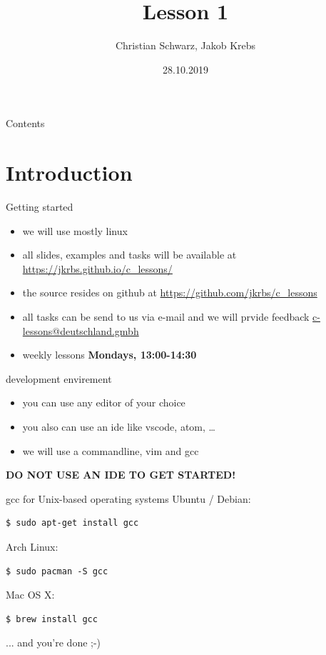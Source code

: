 \documentclass[10pt,graphics,aspectratio=169,table]{beamer}
\title{Lesson 1}
\author{Christian Schwarz, Jakob Krebs}
\date{28.10.2019}
\begin{document}
\maketitle

\begin{frame}{Contents}
	\tableofcontents
\end{frame}

\section{Introduction}
\begin{frame}{Getting started}
  \begin{itemize}
  \item we will use mostly linux
  \item all slides, examples and tasks will be available at
    \url{https://jkrbs.github.io/c_lessons/}
  \item the source resides on github at
    \url{https://github.com/jkrbs/c_lessons}
  \item all tasks can be send to us via e-mail and we will prvide feedback
    \url{c-lessons@deutschland.gmbh}
  \item weekly lessons \textbf{Mondays, 13:00-14:30}
  \end{itemize}
\end{frame}

\begin{frame}{development envirement}
  \begin{itemize}
  \item you can use any editor of your choice
  \item you also can use an ide like vscode, atom, \ldots
  \item we will use a commandline, vim and gcc
  \end{itemize}
  \alert{\textbf{DO NOT USE AN IDE TO GET STARTED!}}
\end{frame}


\begin{frame}[fragile]{gcc for Unix-based operating systems}
	Ubuntu / Debian:
	\begin{lstlisting}[numbers=none]
$ sudo apt-get install gcc
\end{lstlisting}
	\bigskip
	Arch Linux:
	\begin{lstlisting}[numbers=none]
$ sudo pacman -S gcc
\end{lstlisting}
	\bigskip
	Mac OS X:
	\begin{lstlisting}[numbers=none]
$ brew install gcc
\end{lstlisting}
	\bigskip
	... and you're done ;-)
\end{frame}
\end{document}
